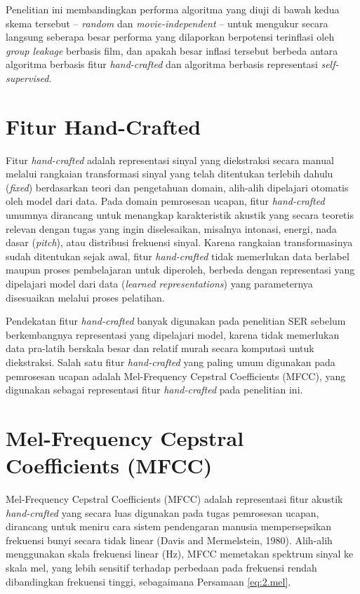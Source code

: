 Penelitian ini membandingkan performa algoritma yang diuji di bawah
kedua skema tersebut -- \emph{random} dan \emph{movie-independent} --
untuk mengukur secara langsung seberapa besar performa yang dilaporkan
berpotensi terinflasi oleh \emph{group leakage} berbasis film, dan
apakah besar inflasi tersebut berbeda antara algoritma berbasis fitur
\emph{hand-crafted} dan algoritma berbasis representasi \emph{self-supervised}.

\section{Fitur Hand-Crafted}
\label{sec:2.4}

Fitur \emph{hand-crafted} adalah representasi sinyal yang diekstraksi
secara manual melalui rangkaian transformasi sinyal yang telah
ditentukan terlebih dahulu (\emph{fixed}) berdasarkan teori dan
pengetahuan domain, alih-alih dipelajari otomatis oleh model dari data.
Pada domain pemrosesan ucapan, fitur \emph{hand-crafted} umumnya
dirancang untuk menangkap karakteristik akustik yang secara teoretis
relevan dengan tugas yang ingin diselesaikan, misalnya intonasi,
energi, nada dasar (\emph{pitch}), atau distribusi frekuensi sinyal.
Karena rangkaian transformasinya sudah ditentukan sejak awal, fitur
\emph{hand-crafted} tidak memerlukan data berlabel maupun proses
pembelajaran untuk diperoleh, berbeda dengan representasi yang
dipelajari model dari data (\emph{learned representations}) yang
parameternya disesuaikan melalui proses pelatihan.

Pendekatan fitur \emph{hand-crafted} banyak digunakan pada penelitian
SER sebelum berkembangnya representasi yang dipelajari model, karena
tidak memerlukan data pra-latih berskala besar dan relatif murah secara
komputasi untuk diekstraksi. Salah satu fitur \emph{hand-crafted} yang
paling umum digunakan pada pemrosesan ucapan adalah Mel-Frequency
Cepstral Coefficients (MFCC), yang digunakan sebagai representasi fitur
\emph{hand-crafted} pada penelitian ini.

\section{Mel-Frequency Cepstral Coefficients (MFCC)}
\label{sec:2.5}

Mel-Frequency Cepstral Coefficients (MFCC) adalah representasi fitur
akustik \emph{hand-crafted} yang secara luas digunakan pada tugas pemrosesan ucapan,
dirancang untuk meniru cara sistem pendengaran manusia mempersepsikan
frekuensi bunyi secara tidak linear (Davis and Mermelstein, 1980).
Alih-alih menggunakan skala frekuensi linear (Hz), MFCC memetakan
spektrum sinyal ke skala mel, yang lebih sensitif terhadap perbedaan
pada frekuensi rendah dibandingkan frekuensi tinggi, sebagaimana
Persamaan \ref{eq:2.mel}.


